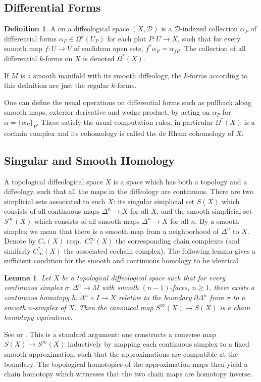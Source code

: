 \documentclass{scrartcl}
\let\emph\relax
\newcommand{\emphi}[1]{\index{#1}\emph{#1}}
\theoremstyle{plain}
\newtheorem{lemma}[theorem]{Lemma}
\theoremstyle{definition}
\newtheorem{definition}[theorem]{Definition}
\begin{document}
\subsection{Differential Forms}
\begin{definition}
    A \emphi{differential $k$-form} on a diffeological space $(X,\mathcal D)$ is a $\mathcal D$-indexed collection $\alpha_P$ of differential forms $\alpha_P\in \Omega^k(U_P)$ for each plot $P\colon U\to X$, such that for every smooth map $f\colon U\to V$ of euclidean open sets, $f^*\alpha_P = \alpha_{fP}$. The collection of all differential $k$-forms on $X$ is denoted $\Omega^*(X)$.
\end{definition}
If $M$ is a smooth manifold with its smooth diffeology, the $k$-forms according to this definition are just the regular $k$-forms. 

One can define the usual operations on differential forms such as pullback along smooth maps, exterior derivative and wedge product, by acting on $\alpha_P$ for $\alpha=\{\alpha_P\}_P$. These satisfy the usual computation rules, in particular $\Omega^*(X)$ is a cochain complex and its cohomology is called the de Rham cohomology of $X$.

\subsection{Singular and Smooth Homology} A topological diffeological space $X$ is a space which has both a topology and a diffeology, such that all the maps in the diffeology are continuous. There are two simplicial sets associated to such $X$: its singular simplicial set $S(X)$ which consists of all continuous maps $\Delta^n\to X$ for all $X$, and the smooth simplicial set $S^\infty(X)$ which consists of all smooth maps $\Delta^n\to X$ for all $n$. By a smooth simplex we mean that there is a smooth map from a neighborhood of $\Delta^n$ to $X$. Denote by $C_*(X)$ resp.\ $C_*^\infty(X)$ the corresponding chain complexes (and similarly $C^*_\infty(X)$ the associated cochain complex). The following lemma gives a sufficient condition for the smooth and continuous homology to be identical.
\begin{lemma}
    Let $X$ be a topological diffeological space such that for every continuous simplex $\sigma\colon \Delta^n\to M$ with smooth $(n-1)$-faces, $n\geq 1$, there exists a continuous homotopy $h\colon \Delta^n\times I\to X$ relative to the boundary $\partial\Delta^n$ from $\sigma$ to a smooth $n$-simplex of $X$. Then the canonical map $S^\infty(X) \to S(X)$ is a chain homotopy equivalence. 
\end{lemma}
See \cite{chen1977iterated} or \cite{parkproof}. This is a standard argument: one constructs a converse map $S(X)\to S^\infty(X)$ inductively by mapping each continuous simplex to a fixed smooth approximation, such that the approximations are compatible at the boundary. The topological homotopies of the approximation maps then yield a chain homotopy which witnesses that the two chain maps are homotopy inverse.
\end{document}
